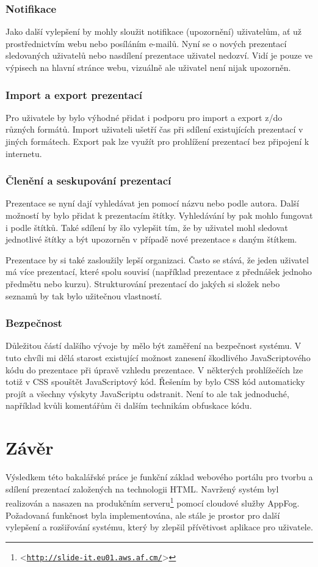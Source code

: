 \documentclass[11pt,twoside,a4paper]{book}
\let\oldUrl\url									%
\renewcommand\url[1]{<\texttt{\oldUrl{#1}}>}
\begin{document}
\subsection{Notifikace}
Jako další vylepšení by mohly sloužit notifikace (upozornění) uživatelům, ať už prostřednictvím webu nebo posíláním e-mailů. Nyní se o nových prezentací sledovaných uživatelů nebo nasdílení prezentace uživatel nedozví. Vidí je pouze ve výpisech na hlavní stránce webu, vizuálně ale uživatel není nijak upozorněn.

\subsection{Import a export prezentací}
Pro uživatele by bylo výhodné přidat i podporu pro import a export z/do různých formátů. Import uživateli ušetří čas při sdílení existujících prezentací v jiných formátech. Export pak lze využít pro prohlížení prezentací bez připojení k internetu.

\subsection{Členění a seskupování prezentací}
Prezentace se nyní dají vyhledávat jen pomocí názvu nebo podle autora. Další možností by bylo přidat k prezentacím štítky. Vyhledávání by pak mohlo fungovat i podle štítků. Také sdílení by šlo vylepšit tím, že by uživatel mohl sledovat jednotlivé štítky a být upozorněn v případě nové prezentace s daným štítkem.

Prezentace by si také zasloužily lepší organizaci. Často se stává, že jeden uživatel má více prezentací, které spolu souvisí (například prezentace z přednášek jednoho předmětu nebo kurzu). Strukturování prezentací do jakých si složek nebo seznamů by tak bylo užitečnou vlastností.

\subsection{Bezpečnost}
Důležitou částí dalšího vývoje by mělo být zaměření na bezpečnost systému. V tuto chvíli mi dělá starost existující možnost zanesení škodlivého JavaScriptového kódu do prezentace při úpravě vzhledu prezentace. V některých prohlížečích lze totiž v CSS spouštět JavaScriptový kód. Řešením by bylo CSS kód automaticky projít a všechny výskyty JavaScriptu odstranit. Není to ale tak jednoduché, například kvůli komentářům či dalším technikám obfuskace kódu.


\chapter{Závěr}
Výsledkem této bakalářské práce je funkční základ webového portálu pro tvorbu a sdílení prezentací založených na technologii HTML. Navržený systém byl realizován a nasazen na produkčním serveru\footnote{\url{http://slide-it.eu01.aws.af.cm/}} pomocí cloudové služby AppFog. Požadovaná funkčnost byla implementována, ale stále je prostor pro další vylepšení a rozšiřování systému, který by zlepšil přívětivost aplikace pro uživatele.
\end{document}
